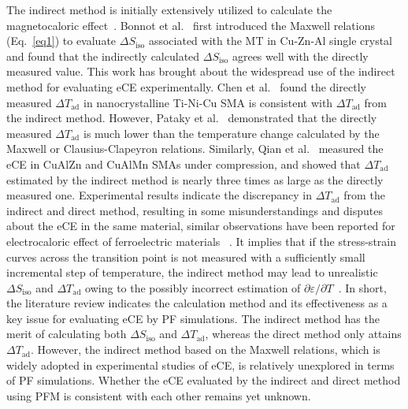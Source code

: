 \documentclass[reprint,3p,sort&compress,times,onecolumn]{elsarticle}
\begin{document}
The indirect method is initially extensively utilized to calculate the magnetocaloric effect~\cite{phan2007review,gschneidnerjr2005recent}. 
Bonnot et al.~\cite{bonnot2008elastocaloric} first introduced the Maxwell relations (Eq.~\ref{eq1}) to evaluate $\Delta S_{\text{iso}}$ associated with the MT in Cu-Zn-Al single crystal and found that the indirectly calculated $\Delta S_{\text{iso}}$ agrees well with the directly measured value. This work has brought about the widespread use of the indirect method for evaluating eCE experimentally. 
Chen et al.~\cite{chen2019giant} found the directly measured $\Delta T_{\text{ad}}$ in nanocrystalline Ti-Ni-Cu SMA is consistent with $\Delta T_{\text{ad}}$ from the indirect method. 
However, Pataky et al.~\cite{pataky2015elastocaloric} demonstrated that the directly measured $\Delta T_{\text{ad}}$ is much lower than the temperature change calculated by the Maxwell or Clausius-Clapeyron relations. Similarly, Qian et al.~\cite{qian2016elastocaloric} measured the eCE in CuAlZn and CuAlMn SMAs under compression, and showed that $\Delta T_{\text{ad}}$ estimated by the indirect method is nearly three times as large as the directly measured one. Experimental results indicate the discrepancy in $\Delta T_{\text{ad}}$ from the indirect and direct method, resulting in some misunderstandings and disputes about the eCE in the same material, similar observations have been reported for electrocaloric effect of ferroelectric materials  ~\cite{grunebohm2018origins}.
It implies that if the stress-strain curves across the transition point is not measured with a sufficiently small incremental step of temperature, the indirect method may lead to unrealistic $\Delta S_{\text{iso}}$ and $\Delta T_{\text{ad}}$ owing to the possibly incorrect estimation of $\partial\varepsilon/\partial T$~\cite{tuvsek2016understanding,moya2020caloric}.
In short, the literature review indicates the calculation method and its effectiveness as a key issue for evaluating eCE by PF simulations. The indirect method has the merit of calculating both $\Delta S_{\text{iso}}$ and $\Delta T_{\text{ad}}$, whereas the direct method only attains $\Delta T_{\text{ad}}$.
However, the indirect method based on the Maxwell relations, which is widely adopted in experimental studies of eCE, is relatively unexplored in terms of PF simulations. Whether the eCE evaluated by the indirect and direct method using PFM is consistent with each other remains yet unknown. 
\end{document}
